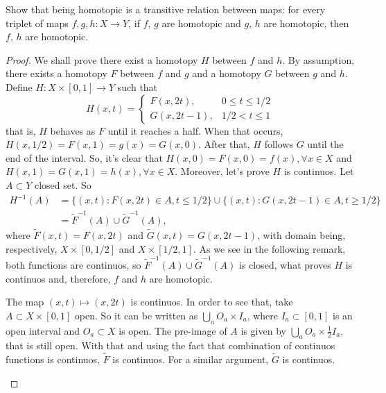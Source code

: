 \noindent\linia

\begin{exercise}
    Show that being homotopic is a transitive relation between maps: for every
    triplet of maps $f, g, h: X \to Y$, if $f$, $g$ are homotopic and $g$, $h$
    are homotopic, then $f$, $h$ are homotopic.
\end{exercise}

\begin{proof}

We shall prove there exist a homotopy $H$ between $f$ and $h$. By assumption,
there exists a homotopy $F$ between $f$ and $g$ and a homotopy $G$ between $g$
and $h$. Define $H: X \times [0,1] \to Y$ such that 
$$
H(x,t) = \begin{cases}
    F(x,2t), &0 \le t \le 1/2 \\
    G(x,2t - 1), &1/2 < t \le 1   
\end{cases}
$$
that is, $H$ behaves as $F$ until it reaches a half. When that occurs,
$H(x,1/2) = F(x,1) = g(x) = G(x, 0)$. After that, $H$ follows $G$ until the
end of the interval. So, it's clear that $H(x,0) = F(x,0) = f(x), \forall x
\in X$ and $H(x,1) = G(x,1) = h(x), \forall x \in X$. Moreover, let's  prove
$H$ is continuos. Let $A \subset Y$ closed set. So
\begin{equation*}
    \begin{split}
        H^{-1}(A) &= \{(x,t) : F(x,2t) \in A, t \le 1/2\} \cup \{(x,t) : G(x,2t - 1) \in A, t \ge 1/2\} \\
        &= \tilde{F}^{-1}(A) \cup \tilde{G}^{-1}(A), 
    \end{split}
\end{equation*}
where $\tilde{F}(x,t) = F(x,2t)$ and $\tilde{G}(x,t) = G(x, 2t - 1)$, with domain being, respectively, $X \times [0,1/2]$ and $X \times [1/2, 1]$. As we see
in the following remark, both functions are continuos, so $\tilde{F}^{-1}(A)
\cup \tilde{G}^{-1}(A)$ is closed, what proves $H$ is continuos and,
therefore, $f$ and $h$ are homotopic. 

\begin{remark}
    The map $(x,t) \mapsto (x,2t)$ is continuos. In order to see that, take $A
    \subset X \times [0,1]$ open. So it can be written as $\bigcup_a O_a
    \times I_a$, where $I_a \subset [0,1]$ is an open interval and $O_a
    \subset X$ is open. The pre-image of $A$ is given by $\bigcup_a O_a
    \times \frac{1}{2}I_a$, that is still open.  With that and using the fact
    that combination of continuos functions is continuos, $\tilde{F}$ is
    continuos. For a similar argument, 
    $\tilde{G}$ is continuos. 
\end{remark}

\end{proof}

